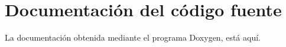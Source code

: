 

\section{Documentación del código fuente}

La documentación obtenida mediante el programa Doxygen, está aquí.


